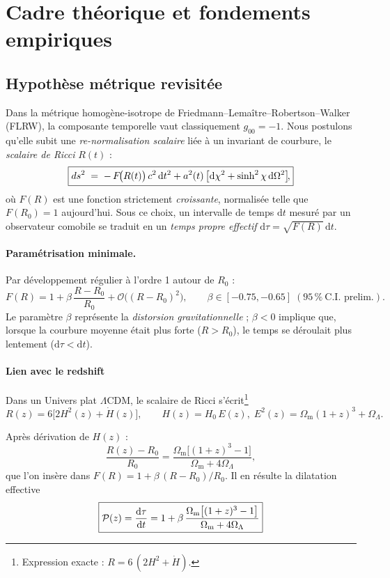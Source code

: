 \documentclass[11pt]{article}
\begin{document}
\label{sec:derivationPT}

\section{Cadre théorique et fondements empiriques}
\label{sec:fondements}

\subsection{Hypothèse métrique revisitée}

Dans la métrique homogène-isotrope de Friedmann–Lemaître–Robertson–Walker (FLRW),  
la composante temporelle vaut classiquement \(g_{00}=-1\).  
Nous postulons qu’elle subit une \emph{re-normalisation scalaire} liée à un invariant
de courbure, le \emph{scalaire de Ricci} \(R(t)\) :
\[
\boxed{%
    ds^{2} \;=\;
    -\,F\!\bigl(R(t)\bigr)\,c^{2}\,\mathrm dt^{2}
    + a^{2}(t)\,\bigl[\mathrm d\chi^{2}+\sinh^{2}\chi\,\mathrm d\Omega^{2}\bigr]\!,
}
\]
où \(F(R)\) est une fonction strictement \emph{croissante}, normalisée telle que
\(F(R_{0})=1\) aujourd’hui.  
Sous ce choix, un intervalle de temps \(\mathrm dt\) mesuré par un observateur
comobile se traduit en un \emph{temps propre effectif}
\(\mathrm d\tau = \sqrt{F(R)}\,\mathrm dt\).

\paragraph{Paramétrisation minimale.}
Par développement régulier à l’ordre 1 autour de \(R_{0}\) :
\[
F(R)=1+\beta\,\frac{R-R_{0}}{R_{0}}
     +\mathcal{O}\!\bigl((R-R_{0})^{2}\bigr),
\qquad
\beta\in[-0.75,-0.65]\; (95\,\%\ \text{C.I.\ prelim.}).
\]
Le paramètre \(\beta\) représente la \emph{distorsion gravitationnelle} ;  
\(\beta<0\) implique que, lorsque la courbure moyenne était plus forte
(\(R>R_{0}\)), le temps se déroulait plus lentement
(\(\mathrm d\tau < \mathrm dt\)).

\paragraph{Lien avec le redshift}\label{sec:PT}

Dans un Univers plat \(\Lambda\)CDM, le scalaire de Ricci s’écrit\footnote{Expression exacte : \(R=6\,(2H^{2}+\dot H)\).}
\[
R(z)=6\bigl[2H^{2}(z)+\dot H(z)\bigr],
\qquad
H(z)=H_{0}\,E(z),\;
E^{2}(z)=\Omega_{\mathrm{m}}(1+z)^{3}+\Omega_{\Lambda}.
\]

Après dérivation de \(H(z)\) :
\[
\frac{R(z)-R_{0}}{R_{0}}
      =\frac{\Omega_{\mathrm{m}}\bigl[(1+z)^{3}-1\bigr]}
            {\Omega_{\mathrm{m}}+4\Omega_{\Lambda}},
\]
que l’on insère dans \(F(R)=1+\beta\,(R-R_{0})/R_{0}\).  
Il en résulte la dilatation effective
\[
\boxed{%
\mathcal{P}(z)=
\frac{\mathrm d\tau}{\mathrm dt}
=1+\beta\,
\frac{\Omega_{\mathrm{m}}\bigl[(1+z)^{3}-1\bigr]}
     {\Omega_{\mathrm{m}}+4\Omega_{\Lambda}}
}
\]
\end{document}
